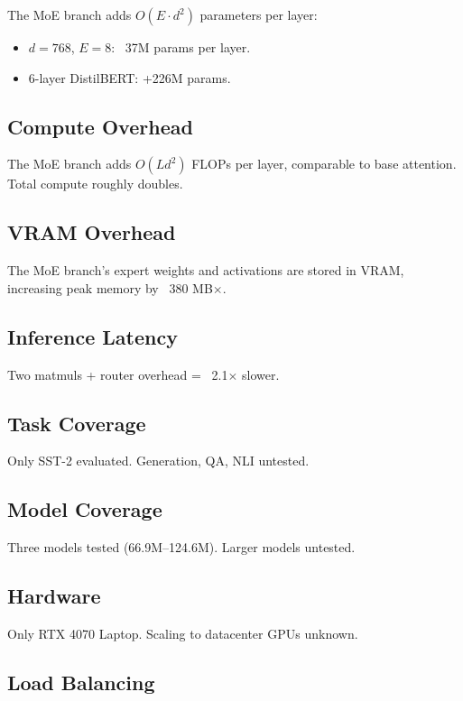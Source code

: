 The MoE branch adds $O(E \cdot d^2)$ parameters per layer:
\begin{itemize}
\item $d = 768$, $E = 8$: ~37M params per layer.
\item 6-layer DistilBERT: +226M params.

\end{itemize}
\subsection{Compute Overhead}

The MoE branch adds $O(L d^2)$ FLOPs per layer, comparable to base 
attention. Total compute roughly doubles.

\subsection{VRAM Overhead}

The MoE branch's expert weights and activations are stored in VRAM, 
increasing peak memory by ~380 MB$\times$.

\subsection{Inference Latency}

Two matmuls + router overhead = ~2.1$\times$ slower.

\subsection{Task Coverage}

Only SST-2 evaluated. Generation, QA, NLI untested.

\subsection{Model Coverage}

Three models tested (66.9M--124.6M). Larger models untested.

\subsection{Hardware}

Only RTX 4070 Laptop. Scaling to datacenter GPUs unknown.

\subsection{Load Balancing}

